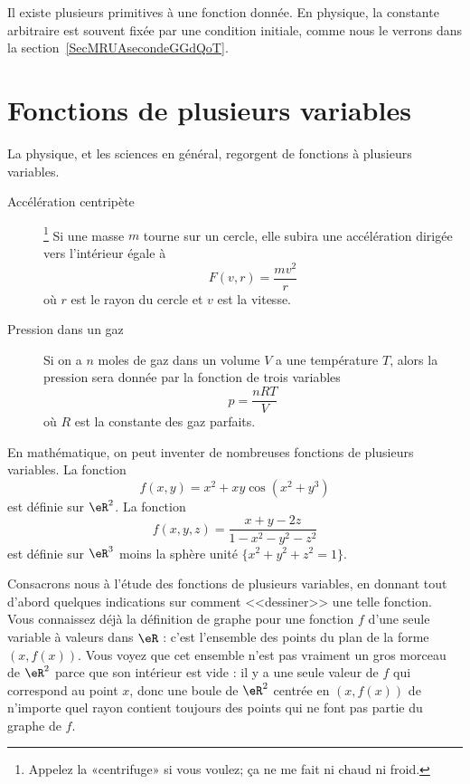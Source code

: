 \begin{normaltext}
	Il existe plusieurs primitives à une fonction donnée. En physique, la constante arbitraire est souvent fixée par une condition initiale, comme nous le verrons dans la section~\ref{SecMRUAsecondeGGdQoT}.
\end{normaltext}

\section{Fonctions de plusieurs variables}

La physique, et les sciences en général, regorgent de fonctions à plusieurs variables.
\begin{description}
	\item[Accélération centripète]\footnote{Appelez la «centrifuge» si vous voulez; ça ne me fait ni chaud ni froid.}  Si une masse \( m\) tourne sur un cercle, elle subira une accélération dirigée vers l'intérieur égale à
	      \begin{equation}
		      F(v,r)=\frac{ mv^2 }{ r }
	      \end{equation}
	      où \( r\) est le rayon du cercle et \( v\) est la vitesse.
	\item[Pression dans un gaz] Si on a \( n\) moles de gaz dans un volume \( V\) a une température \( T\), alors la pression sera donnée par la fonction de trois variables
	      \begin{equation}
		      p=\frac{ nRT }{ V }
	      \end{equation}
	      où \( R\) est la constante des gaz parfaits.
\end{description}

En mathématique, on peut inventer de nombreuses fonctions de plusieurs variables. La fonction
\begin{equation}
	f(x,y)=x^2+xy\cos(x^2+y^3)
\end{equation}
est définie sur \( \eR^2\). La fonction
\begin{equation}
	f(x,y,z)=\frac{ x+y-2z }{ 1-x^2-y^2-z^2 }
\end{equation}
est définie sur \( \eR^3\) moins la sphère unité \( \{ x^2+y^2+z^2=1 \}\).

Consacrons nous à l'étude des fonctions de plusieurs variables, en donnant tout d'abord quelques indications sur comment <<dessiner>> une telle fonction. Vous connaissez déjà la définition de graphe pour une fonction \( f\) d'une seule variable à valeurs dans \( \eR\) : c'est l'ensemble des points du plan de la forme \( (x, f(x))\). Vous voyez que cet ensemble n'est pas vraiment un gros morceau de \( \eR^2\) parce que son intérieur est vide : il y a une seule valeur de \( f\) qui correspond au point \( x\), donc une boule de \( \eR^2\) centrée en \( (x, f(x))\) de n'importe quel rayon contient toujours des points qui ne font pas partie du graphe de \( f\).

